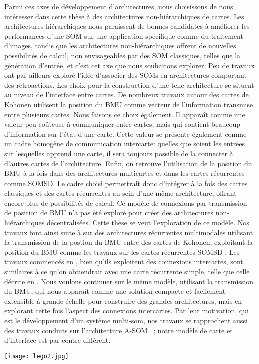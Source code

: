 \documentclass[../main]{subfiles}
\begin{document}
Parmi ces axes de développement d'architectures, nous choisissons de nous intéresser dans cette thèse à des architectures non-hiérarchiques de cartes.
Les architectures hiérarchiques nous paraissent de bonnes candidates à améliorer les performances d'une SOM sur une application spécifique comme du traitement d'images, tandis que les architectures non-hiérarchiques offrent de nouvelles possibilités de calcul, non envisageables par des SOM classiques, telles que la génération d'entrée, et c'est cet axe que nous souhaitons explorer.
Peu de travaux ont par ailleurs exploré l'idée d'associer des SOMs en architectures comportant des rétroactions.
Les choix pour la construction d'une telle architecture se situent au niveau de l'interface entre cartes. De nombreux travaux autour des cartes de Kohonen utilisent la position du BMU comme vecteur de l'information transmise entre plusieurs cartes. 
Nous faisons ce choix également. Il apparaît comme une valeur peu coûteuse à communiquer entre cartes, mais qui contient beaucoup d'information sur l'état d'une carte. Cette valeur se présente également comme un cadre homogène de communication intercarte: quelles que soient les entrées sur lesquelles apprend une carte, il sera toujours possible de la connecter à d'autres cartes de l'architecture. 
Enfin, on retrouve l'utilisation de la position du BMU à la fois dans des architectures multicartes et dans les cartes récurrentes comme SOMSD. Le cadre choisi permettrait donc d'intégrer à la fois des cartes classiques et des cartes récurrentes au sein d'une même architecture, offrant encore plus de possibilités de calcul.
Ce modèle de connexions par transmission de position de BMU n'a pas été exploré pour créer des architectures non-hiérarchiques décentralisées. Cette thèse se veut l'exploration de ce modèle.
Nos travaux font ainsi suite à \cite{baheux_towards_2014} sur des architectures récurrentes multimodales utilisant la transmission de la postion du BMU entre des cartes de Kohonen, exploitant la position du BMU comme les travaux sur les cartes récurrentes SOMSD \cite{hagenbuchner_self-organizing_2003,Strickert2003UnsupervisedRS,fix20}.
Les travaux commencés en \cite{baheux_towards_2014}, bien qu'ils exploitent des connexions intercartes, sont similaires à ce qu'on obtiendrait avec une carte récurrente simple, telle que celle décrite en \cite{fix20}.
Nous voulons continuer sur le même modèle, utilisant la transmission du BMU, qui nous apparaît comme une solution compacte et facilement extensible à grande échelle pour construire des grandes architectures, mais en explorant cette fois l'aspect des connexions intercartes.
Par leur motivation, qui est le développement d'un système multi-som, nos travaux se rapprochent aussi des travaux conduits sur l'architecture A-SOM \cite{johnsson_associating_2008, johnsson_associative_2009,gil_sarasom_2015, Buonamente2015DiscriminatingAS}~; notre modèle de carte et d'interface est par contre différent.



\begin{figure*}[b]
    \centering\texttt{[image: lego2.jpg]}
\end{figure*}

\ifSubfilesClassLoaded{
    \printbibliography
}{}
\end{document}

